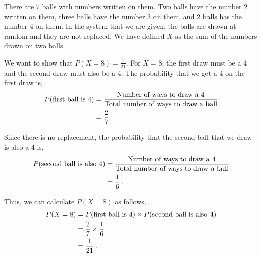 %
%


\begin{subquestions}
	
\subquestion

There are 7 balls with numbers written on them. Two balls have the number 2 written on them, three balls have the number 3 on them, and 2 balls has the number 4 on them. In the system that we are given, the balls are drawn at random and they are not replaced. We have defined $X$ as the sum of the numbers drawn on two balls. 

\begin{subsubquestions}
	
\subsubquestion

We want to show that $P(X=8)=\frac{1}{21}$. For $X=8$, the first draw must be a 4 and the second draw must also be a 4. The probability that we get a 4 on the first draw is,
\begin{align}
	P(\text{first ball is 4}) & = \frac{\text{Number of ways to draw a 4}}{\text{Total number of ways to draw a ball}} \nonumber \\
	                          & = \frac{2}{7} \,.
\end{align}

Since there is no replacement, the probability that the second ball that we draw is also a 4 is,
\begin{align}
	P(\text{second ball is also 4}) & = \frac{\text{Number of ways to draw a 4}}{\text{Total number of ways to draw a ball}} \nonumber \\
	                                & = \frac{1}{6} \,.
\end{align}

Thus, we can calculate $P(X=8)$ as follows,
\begin{align}
	P(X=8) & = P(\text{first ball is 4}) \times P(\text{second ball is also 4}) \nonumber \\
	       & = \frac{2}{7} \times \frac{1}{6} \nonumber \\
	       & = \frac{1}{21} \,.
\end{align}


\end{subsubquestions}
\end{subquestions}

